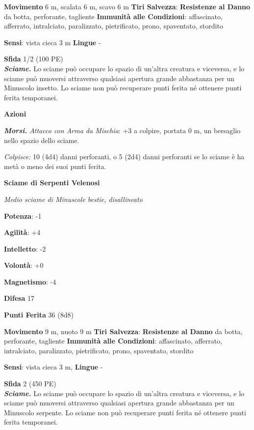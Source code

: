 \begin{multicols}{2}
\textbf{Movimento} 6 m, scalata 6 m, scavo 6 m
\textbf{Tiri Salvezza}:
\textbf{Resistenze al Danno} da botta, perforante, tagliente
\textbf{Immunità alle Condizioni}: affascinato, afferrato, intralciato,
paralizzato, pietrificato, prono, spaventato, stordito

\textbf{Sensi}: vista cieca 3 m \textbf{Lingue} -

\textbf{Sfida} 1/2 (100 PE)\smallskip\\

\emph{\textbf{Sciame.}} Lo sciame può occupare lo spazio di un'altra
creatura e viceversa, e lo sciame può muoversi attraverso qualsiasi
apertura grande abbastanza per un Minuscolo insetto. Lo sciame non può
recuperare punti ferita né ottenere punti ferita temporanei.

\smallskip\textbf{Azioni}

\emph{\textbf{Morsi.} Attacco con Arma da Mischia}: +3 a colpire,
portata 0 m, un bersaglio nello spazio dello sciame.

\emph{Colpisce:} 10 (4d4) danni perforanti, o 5 (2d4) danni perforanti
se lo sciame è ha metà o meno dei suoi punti ferita.



\textbf{Sciame di Serpenti Velenosi}

\emph{Medio sciame di Minuscole bestie, disallineato}

\textbf{Potenza}: -1

\textbf{Agilità}: +4

\textbf{Intelletto}: -2

\textbf{Volontà}: +0

\textbf{Magnetismo}: -4

\textbf{Difesa} 17

\textbf{Punti Ferita} 36 (8d8)

\textbf{Movimento} 9 m, nuoto 9 m
\textbf{Tiri Salvezza}:
\textbf{Resistenze al Danno} da botta, perforante, tagliente
\textbf{Immunità alle Condizioni}: affascinato, afferrato, intralciato,
paralizzato, pietrificato, prono, spaventato, stordito

\textbf{Sensi}: vista cieca 3 m,  \textbf{Lingue} -

\textbf{Sfida} 2 (450 PE)\smallskip\\

\emph{\textbf{Sciame.}} Lo sciame può occupare lo spazio di un'altra
creatura e viceversa, e lo sciame può muoversi attraverso qualsiasi
apertura grande abbastanza per un Minuscolo serpente. Lo sciame non può
recuperare punti ferita né ottenere punti ferita temporanei.


\end{multicols}
